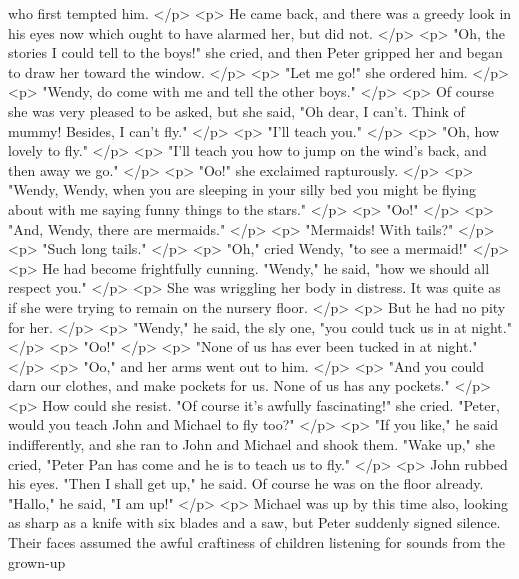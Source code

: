       who first tempted him.
    </p>
    <p>
      He came back, and there was a greedy look in his eyes now which ought to
      have alarmed her, but did not.
    </p>
    <p>
      "Oh, the stories I could tell to the boys!" she cried, and then Peter
      gripped her and began to draw her toward the window.
    </p>
    <p>
      "Let me go!" she ordered him.
    </p>
    <p>
      "Wendy, do come with me and tell the other boys."
    </p>
    <p>
      Of course she was very pleased to be asked, but she said, "Oh dear, I
      can't. Think of mummy! Besides, I can't fly."
    </p>
    <p>
      "I'll teach you."
    </p>
    <p>
      "Oh, how lovely to fly."
    </p>
    <p>
      "I'll teach you how to jump on the wind's back, and then away we go."
    </p>
    <p>
      "Oo!" she exclaimed rapturously.
    </p>
    <p>
      "Wendy, Wendy, when you are sleeping in your silly bed you might be flying
      about with me saying funny things to the stars."
    </p>
    <p>
      "Oo!"
    </p>
    <p>
      "And, Wendy, there are mermaids."
    </p>
    <p>
      "Mermaids! With tails?"
    </p>
    <p>
      "Such long tails."
    </p>
    <p>
      "Oh," cried Wendy, "to see a mermaid!"
    </p>
    <p>
      He had become frightfully cunning. "Wendy," he said, "how we should all
      respect you."
    </p>
    <p>
      She was wriggling her body in distress. It was quite as if she were trying
      to remain on the nursery floor.
    </p>
    <p>
      But he had no pity for her.
    </p>
    <p>
      "Wendy," he said, the sly one, "you could tuck us in at night."
    </p>
    <p>
      "Oo!"
    </p>
    <p>
      "None of us has ever been tucked in at night."
    </p>
    <p>
      "Oo," and her arms went out to him.
    </p>
    <p>
      "And you could darn our clothes, and make pockets for us. None of us has
      any pockets."
    </p>
    <p>
      How could she resist. "Of course it's awfully fascinating!" she cried.
      "Peter, would you teach John and Michael to fly too?"
    </p>
    <p>
      "If you like," he said indifferently, and she ran to John and Michael and
      shook them. "Wake up," she cried, "Peter Pan has come and he is to teach
      us to fly."
    </p>
    <p>
      John rubbed his eyes. "Then I shall get up," he said. Of course he was on
      the floor already. "Hallo," he said, "I am up!"
    </p>
    <p>
      Michael was up by this time also, looking as sharp as a knife with six
      blades and a saw, but Peter suddenly signed silence. Their faces assumed
      the awful craftiness of children listening for sounds from the grown-up
